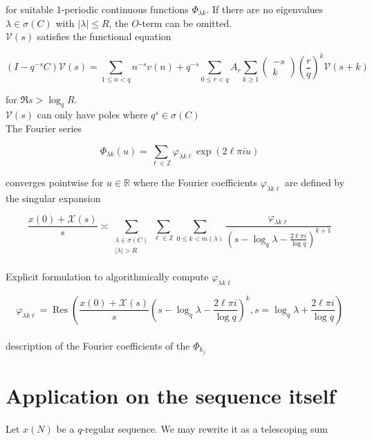 \documentclass[10pt]{article}
\begin{document}
for suitable 1-periodic continuous functions $\Phi_{\lambda k}$. If there are no eigenvalues $\lambda \in \sigma(C)$ with $|\lambda| \leq R$, the $O$-term can be omitted.
\\

$\mathcal{V}(s)$ satisfies the functional equation

$$
\left(I-q^{-s} C\right) \mathcal{V}(s)=\sum_{1 \leq n<q} n^{-s} v(n)+q^{-s} \sum_{0 \leq r<q} A_{r} \sum_{k \geq 1}\left(\begin{array}{c}
	-s \\
	k
\end{array}\right)\left(\frac{r}{q}\right)^{k} \mathcal{V}(s+k)
$$

for $\Re s>\log _{q} R$.
\\

$\mathcal{V}(s)$ can only have poles where $q^{s} \in \sigma(C)$
\\

The Fourier series

$$
\Phi_{\lambda k}(u)=\sum_{\ell \in \mathbb{Z}} \varphi_{\lambda k \ell} \exp (2 \ell \pi i u)
$$

converges pointwise for $u \in \mathbb{R}$ where the Fourier coefficients $\varphi_{\lambda k \ell}$ are defined by the singular expansion

$$
\frac{x(0)+\mathcal{X}(s)}{s} \asymp \sum_{\substack{\lambda \in \sigma(C) \\|\lambda|>R}} \sum_{\ell \in \mathbb{Z}} \sum_{0 \leq k<m(\lambda)} \frac{\varphi_{\lambda k \ell}}{\left(s-\log _{q} \lambda-\frac{2 \ell \pi i}{\log q}\right)^{k+1}}
$$
\\

Explicit formulation to algorithmically compute $\varphi_{\lambda k \ell}$

$$
\varphi_{\lambda k \ell}=\operatorname{Res}\left(\frac{x(0)+\mathcal{X}(s)}{s}\left(s-\log _{q} \lambda-\frac{2 \ell \pi i}{\log q}\right)^{k}, s=\log _{q} \lambda+\frac{2 \ell \pi i}{\log q}\right)
$$
\\
 
description of the Fourier coefficients of the $\Phi_{k_{j}}$

\section{Application on the sequence itself}

Let $x(N)$ be a $q$-regular sequence. We may rewrite it as a telescoping sum
\end{document}
